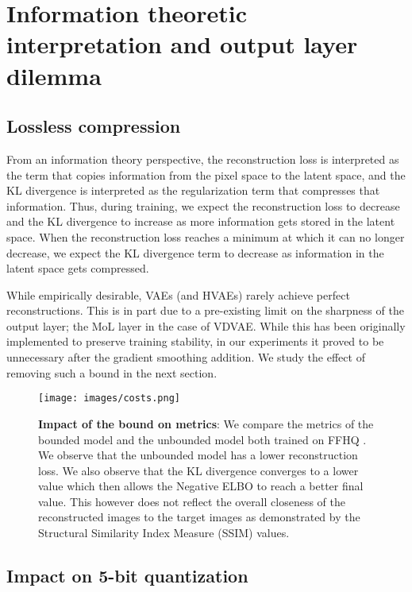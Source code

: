 \documentclass{article}
\begin{document}
\section{Information theoretic interpretation and output layer dilemma}
\label{lossless_compression}
\subsection{Lossless compression}

From an information theory perspective, the reconstruction loss is interpreted as the term that copies information from the pixel space to the latent space, and the KL divergence is interpreted as the regularization term that compresses that information\cite{yu2020frombayestoit, chen2016variational}. Thus, during training, we expect the reconstruction loss to decrease and the KL divergence to increase as more information gets stored in the latent space. When the reconstruction loss reaches a minimum at which it can no longer decrease, we expect the KL divergence term to decrease as information in the latent space gets compressed.

While empirically desirable, VAEs (and HVAEs) rarely achieve perfect reconstructions. This is in part due to a pre-existing limit on the sharpness of the output layer; the MoL layer in the case of VDVAE. While this has been originally implemented to preserve training stability\cite{salimans2017pixelcnn++}, in our experiments it proved to be unnecessary after the gradient smoothing addition. We study the effect of removing such a bound in the next section.

\begin{figure}
    \centering
    \texttt{[image: images/costs.png]}
    \caption{\textbf{Impact of the bound on metrics}: We compare the metrics of the bounded model and the unbounded model both trained on FFHQ . We observe that the unbounded model has a lower reconstruction loss. We also observe that the KL divergence converges to a lower value which then allows the Negative ELBO to reach a better final value. This however does not reflect the overall closeness of the reconstructed images to the target images as demonstrated by the Structural Similarity Index Measure (SSIM)\cite{Wang2004ImageQA} values.}
    \label{costs_fig}
\end{figure}

\subsection{Impact on 5-bit quantization}
\end{document}
